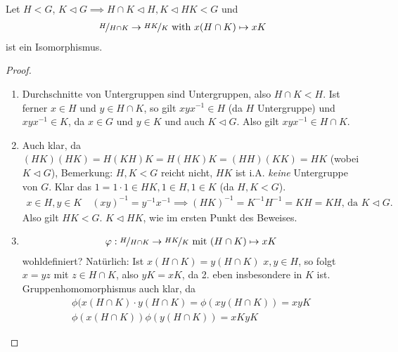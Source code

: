 \begin{proposition}
	Let $H < G$, $K \lhd G \implies H\cap K \lhd H, K\lhd HK < G$ und 
	\begin{align*}
		\lnkset{H}{H \cap K} \to \lnkset{HK}{K} \with x(H\cap K) \mapsto xK
	\end{align*}
	ist ein Isomorphismus.
\end{proposition}
\begin{proof}
	\begin{enumerate}
		\item Durchschnitte von Untergruppen sind Untergruppen, also $H \cap K < H$. Ist ferner $x \in H$ und $y \in H\cap K$, so gilt $xyx^{-1} \in H$ (da $H$ Untergruppe) und $xyx^{-1} \in K$, da $x \in G$ und $y \in K$ und auch $K \lhd G$. Also gilt $xyx^{-1} \in H \cap K$.
		\item Auch klar, da $(HK)(HK) = H(KH)K = H(HK)K = (HH)(KK) = HK$ (wobei $K \lhd G$), Bemerkung: $H,K < G$ reicht nicht, $HK$ ist i.A. \emph{keine} Untergruppe von $G$. Klar das $1 = 1\cdot 1 \in HK, 1 \in H, 1\in K$ (da $H,K < G$).
		\begin{align*}
			x \in H, y\in K\quad (xy)^{-1} = y^{-1}x^{-1} \implies (HK)^{-1} = K^{-1}H^{-1} = KH = KH\text{, da } K\lhd G.
		\end{align*}
		Also gilt $HK < G$. $K \lhd HK$, wie im ersten Punkt des Beweises.
		\item \begin{align*}
		\phi: \lnkset{H}{H \cap K} \to \lnkset{HK}{K} \mit (H \cap K) \mapsto xK
		\end{align*}
		wohldefiniert? Natürlich: Ist $x(H \cap K) = y (H\cap K)$ $x,y \in H$, so folgt $x = yz$ mit $z \in H \cap K$, also $yK = xK$, da 2. eben insbesondere in $K$ ist. Gruppenhomomorphismus auch klar, da
		\begin{align*}
			\phi(x(H \cap K) \cdot y(H \cap K) = \phi(xy(H \cap K)) = xyK\\
			\phi(x(H\cap K))\phi(y(H\cap K)) = xKyK
		\end{align*}
	\end{enumerate}
\end{proof}
